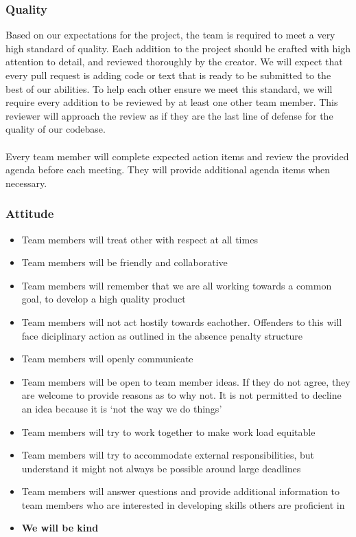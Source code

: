 \documentclass{article}
\begin{document}
\subsubsection*{Quality} 
Based on our expectations for the project, the team is required to meet a very high standard of quality.
Each addition to the project should be crafted with high attention to detail, and reviewed thoroughly by the creator.
We will expect that every pull request is adding code or text that is ready to be submitted to the best of our abilities.
To help each other ensure we meet this standard, we will require every addition to be reviewed by at least one other team member.
This reviewer will approach the review as if they are the last line of defense for the quality of our codebase.\\\\
Every team member will complete expected action items and review the provided agenda before each meeting. They will provide additional agenda items when necessary.

\subsubsection*{Attitude}

\begin{itemize}
\item Team members will treat other with respect at all times
\item Team members will be friendly and collaborative
\item Team members will remember that we are all working towards a common goal, to develop a high quality product
\item Team members will not act hostily towards eachother. Offenders to this will face diciplinary action as outlined in the absence penalty structure
\item Team members will openly communicate
\item Team members will be open to team member ideas. If they do not agree, they are welcome to provide reasons as to why not. It is not permitted to decline an idea because it is `not the way we do things'
\item Team members will try to work together to make work load equitable
\item Team members will try to accommodate external responsibilities, but understand it might not always be possible around large deadlines
\item Team members will answer questions and provide additional information to team members who are interested in developing skills others are proficient in
\item \textbf{We will be kind}
\end{itemize}
\end{document}
